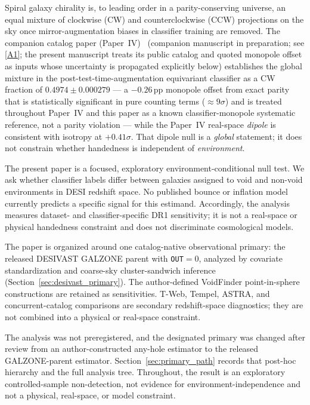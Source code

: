 \documentclass[aps,prd,twocolumn,superscriptaddress,showpacs,preprintnumbers,nofootinbib,longbibliography,floatfix]{revtex4-2}
\newcommand{\repoBase}{https://github.com/Hubify-Projects/bigbounce/blob/main}
\newcommand{\paperIVarxiv}{companion manuscript in preparation}
\begin{document}
Spiral galaxy chirality is, to leading order in a parity-conserving
universe, an equal mixture of clockwise (CW) and counterclockwise (CCW)
projections on the sky once mirror-augmentation biases in classifier
training are removed. The companion catalog paper (Paper~IV)~\cite{golden_chirality_2026}
(\paperIVarxiv;
see \href{\repoBase/pipelines/p2\_chirality/}{[A1]}; the present manuscript
treats its public catalog and quoted monopole offset as inputs whose
uncertainty is propagated explicitly below)
establishes the global mixture in the post-test-time-augmentation
equivariant classifier as a CW fraction of $0.4974 \pm 0.000279$ ---
a $-0.26$\,pp monopole offset from exact parity that is statistically
significant in pure counting terms ($\approx\!9\sigma$) and is treated
throughout Paper~IV and this paper as a known classifier-monopole
systematic reference, not a parity violation --- while the Paper~IV
real-space \emph{dipole} is consistent with isotropy at $+0.41\sigma$.
That dipole null is a \emph{global} statement; it
does not constrain whether handedness is independent of
\emph{environment}.

The present paper is a focused, exploratory environment-conditional null
test. We ask whether classifier labels differ between galaxies assigned
to void and non-void environments in DESI redshift space. No published
bounce or inflation model currently predicts a specific signal for this
estimand. Accordingly, the analysis measures dataset- and
classifier-specific DR1 sensitivity; it is not a real-space or physical
handedness constraint and does not discriminate cosmological models.

The paper is organized around one catalog-native observational primary:
the released DESIVAST GALZONE parent with \texttt{OUT}$=0$, analyzed by
covariate standardization and coarse-sky cluster-sandwich inference
(Section~\ref{sec:desivast_primary}). The author-defined VoidFinder
point-in-sphere constructions are retained as sensitivities. T-Web,
Tempel, ASTRA, and concurrent-catalog comparisons are secondary
redshift-space diagnostics; they are not combined into a physical or
real-space constraint.

The analysis was not preregistered, and the designated primary was
changed after review from an author-constructed any-hole estimator to the
released GALZONE-parent estimator. Section~\ref{sec:primary_path} records
that post-hoc hierarchy and the full analysis tree. Throughout, the
result is an exploratory controlled-sample non-detection, not evidence
for environment-independence and not a physical, real-space, or model
constraint.
\end{document}
